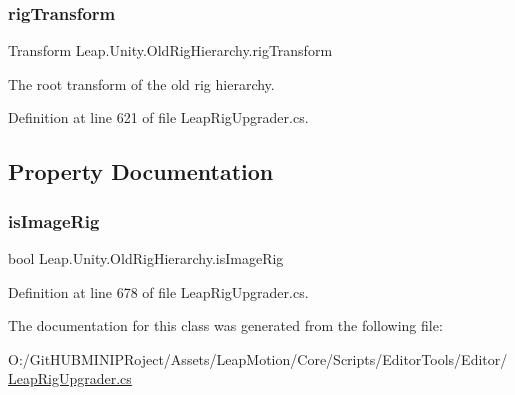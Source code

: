 \subsubsection{\texorpdfstring{rigTransform}{rigTransform}}
{\footnotesize\ttfamily Transform Leap.\+Unity.\+Old\+Rig\+Hierarchy.\+rig\+Transform}



The root transform of the old rig hierarchy. 



Definition at line 621 of file Leap\+Rig\+Upgrader.\+cs.



\subsection{Property Documentation}
\mbox{\label{class_leap_1_1_unity_1_1_old_rig_hierarchy_aa6ff09cd65c3952f379e01467e97c14a}} 
\subsubsection{\texorpdfstring{isImageRig}{isImageRig}}
{\footnotesize\ttfamily bool Leap.\+Unity.\+Old\+Rig\+Hierarchy.\+is\+Image\+Rig\hspace{0.3cm}{\ttfamily [get]}}



Definition at line 678 of file Leap\+Rig\+Upgrader.\+cs.



The documentation for this class was generated from the following file\+:\begin{DoxyCompactItemize}
\item 
O\+:/\+Git\+H\+U\+B\+M\+I\+N\+I\+P\+Roject/\+Assets/\+Leap\+Motion/\+Core/\+Scripts/\+Editor\+Tools/\+Editor/\mbox{\hyperlink{_leap_rig_upgrader_8cs}{Leap\+Rig\+Upgrader.\+cs}}\end{DoxyCompactItemize}
